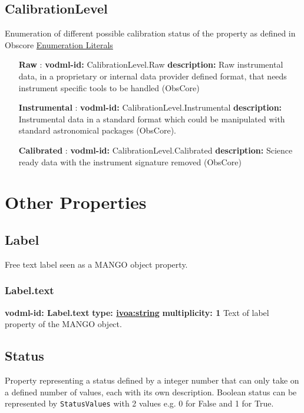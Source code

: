   \subsection{CalibrationLevel}
    \label{sect:CalibrationLevel}
    Enumeration of different possible calibration status of the property as defined in Obscore
    \noindent \underline{Enumeration Literals}
    \vspace{-\parsep}
    \small
    \begin{itemize}
    \item[\textbf{Raw}]: \textbf{vodml-id:} CalibrationLevel.Raw \newline
    \textbf{description:} Raw instrumental data, in a proprietary or internal data provider defined format, that needs instrument specific tools to be handled (ObsCore)
    \item[\textbf{Instrumental}]: \textbf{vodml-id:} CalibrationLevel.Instrumental \newline
    \textbf{description:} Instrumental data in a standard format which could be manipulated with standard astronomical packages (ObsCore).
    \item[\textbf{Calibrated}]: \textbf{vodml-id:} CalibrationLevel.Calibrated \newline
    \textbf{description:} Science ready data with the instrument signature removed (ObsCore)
    \end{itemize}
    \normalsize

\section{Other Properties}

  \subsection{Label}
    \label{sect:Label}
    Free text label seen as a MANGO object property.

    \subsubsection{Label.text}
    \textbf{vodml-id: Label.text} \newline
    \textbf{type: \hyperref[sect:ivoa]{ivoa:string}} \newline
    \textbf{multiplicity: 1} \newline
    Text of label property of the MANGO object.

  \subsection{Status}
    \label{sect:Status}
    Property representing a status defined by a integer number that can only take on a defined number of values, each with its own description. Boolean status can be represented by \texttt{StatusValues} with 2 values e.g. 0 for False and 1 for True.

